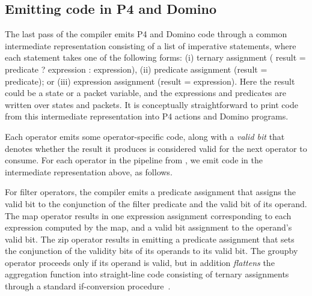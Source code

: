 \subsection{Emitting code in P4 and Domino}
\label{sec:emitting-p4-domino-code}

The last pass of the compiler emits P4 and Domino code through a common
intermediate representation consisting of a list of imperative statements, where
each statement takes one of the following forms: (i) ternary assignment ({\ct
  result = predicate ?  expression : expression}), (ii) predicate assignment
({\ct result = predicate}); or (iii) expression assignment ({\ct result =
  expression}). Here the {\ct result} could be a state or a packet variable, and
the expressions and predicates are written over states and packets. It is
conceptually straightforward to print code from this intermediate representation
into P4 actions and Domino programs.

Each operator emits some operator-specific code, along with a {\em valid bit}
that denotes whether the result it produces is considered valid for the next
operator to consume. For each operator in the pipeline from
, we emit code in the intermediate representation above, as
follows.

For {\ct filter} operators, the compiler emits a predicate assignment that
assigns the valid bit to the conjunction of the filter predicate and the valid
bit of its operand. The {\ct map} operator results in one expression assignment
corresponding to each expression computed by the {\ct map}, and a valid bit
assignment to the operand's valid bit. The {\ct zip} operator results in
emitting a predicate assignment that sets the conjunction of the validity bits
of its operands to its valid bit. The {\ct groupby} operator proceeds only if
its operand is valid, but in addition {\em flattens} the aggregation function
into straight-line code consisting of ternary assignments through a standard
if-conversion procedure~\cite{if-conversion}.



